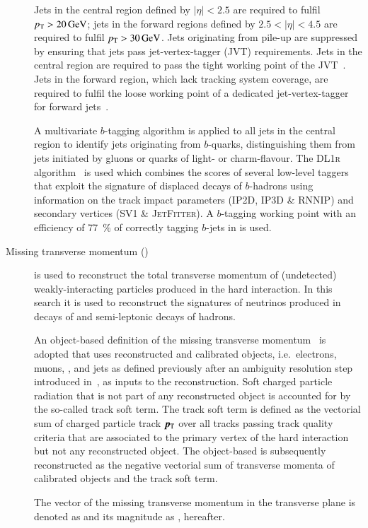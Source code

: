 \begin{description}
  Jets in the central region defined by $|\eta| < 2.5$ are required to
  fulfil $\pT > \SI{20}{\GeV}$; jets in the forward regions defined
  by $2.5 < |\eta| < 4.5$ are required to fulfil
  $\pT > \SI{30}{\GeV}$. Jets originating from pile-up are suppressed
  by ensuring that jets pass jet-vertex-tagger (JVT)
  requirements. Jets in the central region are required to pass the
  tight working point of the JVT~\cite{PERF-2014-03}. Jets in the
  forward region, which lack tracking system coverage, are required to
  fulfil the loose working point of a dedicated jet-vertex-tagger for
  forward jets~\cite{PERF-2016-06-witherratum,ATL-PHYS-PUB-2019-026}.

  A multivariate $b$-tagging algorithm is applied to all jets in the
  central region to identify jets originating from $b$-quarks,
  distinguishing them from jets initiated by gluons or quarks of
  light- or charm-flavour. The \textsc{DL1r}
  algorithm~\cite{FTAG-2018-01,ATL-PHYS-PUB-2017-013} is used which
  combines the scores of several low-level taggers that exploit the
  signature of displaced decays of $b$-hadrons using information on
  the track impact parameters (\textsc{IP2D}, \textsc{IP3D} \&
  \textsc{RNNIP}) and secondary vertices (\textsc{SV1} \&
  \textsc{JetFitter}). A $b$-tagging working point with an efficiency
  of \SI{77}{\percent} of correctly tagging $b$-jets in \ttbar is
  used.

\item[Missing transverse momentum (\pTmiss)] is used to reconstruct
  the total transverse momentum of (undetected) weakly-interacting
  particles produced in the hard interaction. In this search it is
  used to reconstruct the signatures of neutrinos produced in decays
  of \tauleptons and semi-leptonic decays of hadrons.

  An object-based definition of the missing transverse
  momentum~\cite{PERF-2016-07} is adopted that uses reconstructed and
  calibrated objects, i.e.\ electrons, muons, \tauhadvis, and jets as
  defined previously after an ambiguity resolution step introduced
  in~, as inputs to the \pTmiss
  reconstruction. Soft charged particle radiation that is not part of
  any reconstructed object is accounted for by the so-called track
  soft term. The track soft term is defined as the vectorial sum of
  charged particle track $\myvec{\pT}$ over all tracks passing track
  quality criteria that are associated to the primary vertex of the
  hard interaction but not any reconstructed object. The object-based
  \pTmiss is subsequently reconstructed as the negative vectorial sum
  of transverse momenta of calibrated objects and the track soft
  term.

  The vector of the missing transverse momentum in the transverse
  plane is denoted as \pTmiss and its magnitude as \pTmissAbs,
  hereafter.
\end{description}


